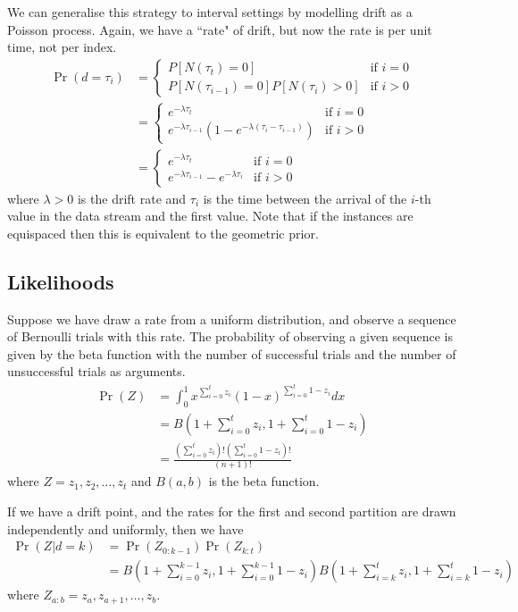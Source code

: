 We can generalise this strategy to interval settings by modelling drift as a Poisson process. Again, we have a ``rate" of drift, but now the rate is per unit time, not per index.
\begin{align}
  \Pr(d=\tau_i) &= \begin{cases}
  P[N(\tau_t)=0]& \text{if }i=0 \\
  P[N(\tau_{i-1})=0]P[N(\tau_i)>0] & \text{if }i>0
  \end{cases} \\
  &= \begin{cases}
  e^{-\lambda\tau_t} & \text{if }i=0 \\
  e^{-\lambda \tau_{i-1}}\left(1-e^{-\lambda(\tau_i-\tau_{i-1})}\right) & \text{if }i>0
  \end{cases} \\
  &= \begin{cases}
  e^{-\lambda\tau_t} & \text{if }i=0 \\
  e^{-\lambda \tau_{i-1}} - e^{-\lambda \tau_i} & \text{if }i>0 \label{eq:prior}
  \end{cases}
\end{align}
where $\lambda > 0$ is the drift rate and $\tau_i$ is the time between the arrival of the $i$-th value in the data stream and the first value. Note that if the instances are equispaced then this is equivalent to the geometric prior.

\subsection{Likelihoods}

Suppose we have draw a rate from a uniform distribution, and observe a sequence of Bernoulli trials with this rate. The probability of observing a given sequence is given by the beta function with the number of successful trials and the number of unsuccessful trials as arguments.
\begin{align}
  \Pr(Z) &= \int_0^1 x^{\sum_{i=0}^t z_i}(1-x)^{\sum_{i=0}^t 1-z_i} dx \\
  &= B\left(1+\sum_{i=0}^t z_i,1+\sum_{i=0}^t 1-z_i\right) \\
  &= \frac{\left(\sum_{i=0}^t z_i\right)! \left(\sum_{i=0}^t 1-z_i\right)!}{(n+1)!}
\end{align}
where $Z = z_1,z_2,\dots,z_t$ and $B(a,b)$ is the beta function.

If we have a drift point, and the rates for the first and second partition are drawn independently and uniformly, then we have
\begin{align}
  \Pr(Z|d=k) &= \Pr(Z_{0:k-1})\Pr(Z_{k:t}) \\
  &= B\left(1+\sum_{i=0}^{k-1} z_i,1+\sum_{i=0}^{k-1} 1-z_i\right) B\left(1+\sum_{i=k}^t z_i,1+\sum_{i=k}^t 1-z_i\right) \label{eq:likelihood}
\end{align}
where $Z_{a:b}=z_a,z_{a+1},\dots,z_b$.

